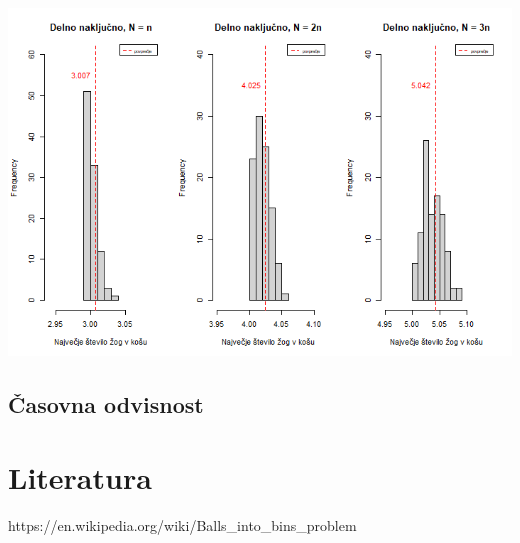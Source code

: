 \documentclass[a4paper, 11pt]{article}
\begin{document}
\includegraphics[scale=0.60]{delno_nakljucno2.png}

\subsection{Časovna odvisnost}

\pagebreak
\section*{Literatura}

https://en.wikipedia.org/wiki/Balls\_into\_bins\_problem
\end{document}
